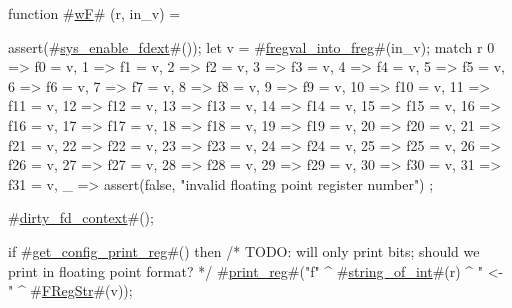 function #\hyperref[sailRISCVzwF]{wF}# (r, in_v) = {
  assert(#\hyperref[sailRISCVzsyszyenablezyfdext]{sys\_enable\_fdext}#());
  let v = #\hyperref[sailRISCVzfregvalzyintozyfreg]{fregval\_into\_freg}#(in_v);
  match r {
    0  => f0 = v,
    1  => f1 = v,
    2  => f2 = v,
    3  => f3 = v,
    4  => f4 = v,
    5  => f5 = v,
    6  => f6 = v,
    7  => f7 = v,
    8  => f8 = v,
    9  => f9 = v,
    10 => f10 = v,
    11 => f11 = v,
    12 => f12 = v,
    13 => f13 = v,
    14 => f14 = v,
    15 => f15 = v,
    16 => f16 = v,
    17 => f17 = v,
    18 => f18 = v,
    19 => f19 = v,
    20 => f20 = v,
    21 => f21 = v,
    22 => f22 = v,
    23 => f23 = v,
    24 => f24 = v,
    25 => f25 = v,
    26 => f26 = v,
    27 => f27 = v,
    28 => f28 = v,
    29 => f29 = v,
    30 => f30 = v,
    31 => f31 = v,
    _  => assert(false, "invalid floating point register number")
  };

  #\hyperref[sailRISCVzdirtyzyfdzycontext]{dirty\_fd\_context}#();

  if   #\hyperref[sailRISCVzgetzyconfigzyprintzyreg]{get\_config\_print\_reg}#()
  then
      /* TODO: will only print bits; should we print in floating point format? */
      #\hyperref[sailRISCVzprintzyreg]{print\_reg}#("f" ^ #\hyperref[sailRISCVzstringzyofzyint]{string\_of\_int}#(r) ^ " <- " ^ #\hyperref[sailRISCVzFRegStr]{FRegStr}#(v));
}
